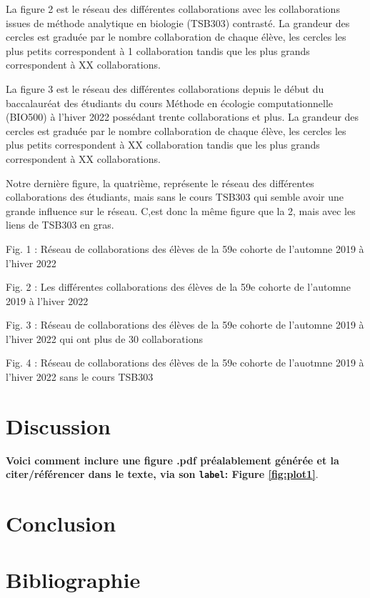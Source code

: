 \documentclass[9pt,twocolumn,twoside,]{pnas-new}
\begin{document}
La figure 2 est le réseau des différentes collaborations avec les
collaborations issues de méthode analytique en biologie (TSB303)
contrasté. La grandeur des cercles est graduée par le nombre
collaboration de chaque élève, les cercles les plus petits correspondent
à 1 collaboration tandis que les plus grands correspondent à XX
collaborations.

La figure 3 est le réseau des différentes collaborations depuis le début
du baccalauréat des étudiants du cours Méthode en écologie
computationnelle (BIO500) à l'hiver 2022 possédant trente collaborations
et plus. La grandeur des cercles est graduée par le nombre collaboration
de chaque élève, les cercles les plus petits correspondent à XX
collaboration tandis que les plus grands correspondent à XX
collaborations.

Notre dernière figure, la quatrième, représente le réseau des
différentes collaborations des étudiants, mais sans le cours TSB303 qui
semble avoir une grande influence sur le réseau. C,est donc la même
figure que la 2, mais avec les liens de TSB303 en gras.

Fig. 1 : Réseau de collaborations des élèves de la 59e cohorte de
l'automne 2019 à l'hiver 2022

Fig. 2 : Les différentes collaborations des élèves de la 59e cohorte de
l'automne 2019 à l'hiver 2022

Fig. 3 : Réseau de collaborations des élèves de la 59e cohorte de
l'automne 2019 à l'hiver 2022 qui ont plus de 30 collaborations

Fig. 4 : Réseau de collaborations des élèves de la 59e cohorte de
l'auotmne 2019 à l'hiver 2022 sans le cours TSB303

\hypertarget{discussion}{%
\section{Discussion}\label{discussion}}

\textbf{Voici comment inclure une figure .pdf préalablement générée et
la citer/référencer dans le texte, via son \texttt{label}: Figure
\ref{fig:plot1}}.

\hypertarget{conclusion}{%
\section{Conclusion}\label{conclusion}}

\newpage

\hypertarget{bibliographie}{%
\section*{Bibliographie}\label{bibliographie}}
\end{document}
